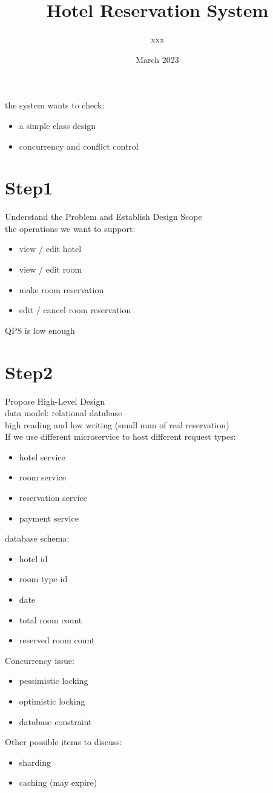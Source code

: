\documentclass{article}
\title{Hotel Reservation System}
\author{xxx}
\date{March 2023}
\begin{document}
\maketitle
the system wants to check:
\begin{itemize}
    \item a simple class design
    \item concurrency and conflict control
\end{itemize}
\section{Step1}
Understand the Problem and Establish Design Scope\\
the operations we want to support:
\begin{itemize}
    \item view / edit hotel
    \item view / edit room
    \item make room reservation
    \item edit / cancel room reservation
\end{itemize}
QPS is low enough

\section{Step2}
Propose High-Level Design\\
data model: relational database\\
high reading and low writing (small num of real reservation)\\
If we use different microservice to host different request types:
\begin{itemize}
    \item hotel service
    \item room service
    \item reservation service
    \item payment service
\end{itemize}
database schema:
\begin{itemize}
    \item hotel id
    \item room type id
    \item date
    \item total room count
    \item reserved room count
\end{itemize}
Concurrency issue:
\begin{itemize}
    \item pessimistic locking
    \item optimistic locking
    \item database constraint
\end{itemize}
Other possible items to discuss:\\
\begin{itemize}
    \item sharding
    \item caching (may expire)
\end{itemize}
\end{document}
